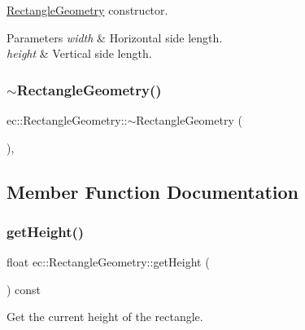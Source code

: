 \mbox{\hyperlink{classec_1_1_rectangle_geometry}{Rectangle\+Geometry}} constructor. 


\begin{DoxyParams}{Parameters}
{\em width} & Horizontal side length. \\
\hline
{\em height} & Vertical side length. \\
\hline
\end{DoxyParams}
\mbox{\label{classec_1_1_rectangle_geometry_ade8488c66850e8c5e858889dc9b266d8}} 
\subsubsection{\texorpdfstring{$\sim$\+Rectangle\+Geometry()}{~RectangleGeometry()}}
{\footnotesize\ttfamily ec\+::\+Rectangle\+Geometry\+::$\sim$\+Rectangle\+Geometry (\begin{DoxyParamCaption}{ }\end{DoxyParamCaption})\hspace{0.3cm}{\ttfamily [virtual]}, {\ttfamily [default]}}



\subsection{Member Function Documentation}
\mbox{\label{classec_1_1_rectangle_geometry_a54989d6e1a08afb8f327bd06a4c2e93b}} 
\subsubsection{\texorpdfstring{get\+Height()}{getHeight()}}
{\footnotesize\ttfamily float ec\+::\+Rectangle\+Geometry\+::get\+Height (\begin{DoxyParamCaption}{ }\end{DoxyParamCaption}) const}



Get the current height of the rectangle. 

